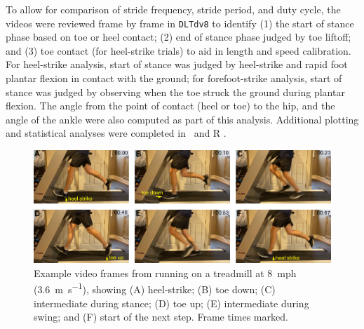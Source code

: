 To allow for comparison of stride frequency, stride period, and duty cycle, the videos were reviewed frame by frame in \lstinline{DLTdv8} to identify (1) the start of stance phase based on toe or heel contact; (2) end of stance phase judged by toe liftoff; and (3) toe contact (for heel-strike trials) to aid in length and speed calibration.  For heel-strike analysis, start of stance was judged by heel-strike and rapid foot plantar flexion in contact with the ground; for forefoot-strike analysis, start of stance was judged by observing when the toe struck the ground during plantar flexion. The angle from the point of contact (heel or toe) to the hip, and the angle of the ankle were also computed as part of this analysis. Additional plotting and statistical analyses were completed in \Matlab\ and R \citep{r2020}. 

\begin{figure}
\begin{center}
\includegraphics{figures/fig-methods-3.png}
\end{center}
\caption{Example video frames from running on a treadmill at \SI{8}{mph} (\SI{3.6}{\meter\per\second}), showing (A) heel-strike; (B) toe down; (C) intermediate during stance; (D) toe up; (E) intermediate during swing; and (F) start of the next step. Frame times marked.} 
\label{fig:methods:dltdv8-2}
\end{figure}


